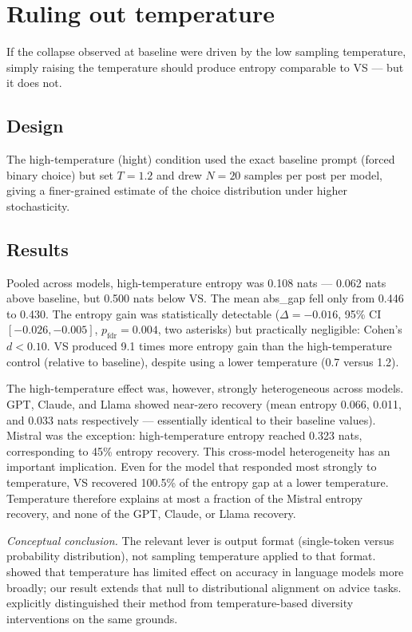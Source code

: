 \section{Ruling out temperature}
\label{sec:d1_temperature}

If the collapse observed at baseline were driven by the low sampling
temperature, simply raising the temperature should produce entropy
comparable to VS — but it does not.

\subsection*{Design}

The high-temperature (hight) condition used the exact baseline prompt
(forced binary choice) but set $T{=}1.2$ and drew $N{=}20$ samples per
post per model, giving a finer-grained estimate of the choice
distribution under higher stochasticity.

\subsection*{Results}

Pooled across models, high-temperature entropy was 0.108 nats —
0.062 nats above baseline, but 0.500 nats below VS. The mean abs\_gap
fell only from 0.446 to 0.430. The entropy gain was statistically
detectable ($\Delta = -0.016$, 95\% CI $[-0.026, -0.005]$,
$p_{\text{fdr}} = 0.004$, two asterisks) but practically negligible:
Cohen's $d < 0.10$. VS produced 9.1 times more entropy gain than
the high-temperature control (relative to baseline), despite using a
lower temperature (0.7 versus 1.2).

The high-temperature effect was, however, strongly heterogeneous across
models. GPT, Claude, and Llama showed near-zero recovery (mean entropy
0.066, 0.011, and 0.033 nats respectively — essentially identical to
their baseline values). Mistral was the exception: high-temperature
entropy reached 0.323 nats, corresponding to 45\% entropy recovery.
This cross-model heterogeneity has an important implication. Even for
the model that responded most strongly to temperature, VS recovered
100.5\% of the entropy gap at a lower temperature. Temperature therefore
explains at most a fraction of the Mistral entropy recovery, and none of
the GPT, Claude, or Llama recovery.

\textit{Conceptual conclusion.} The relevant lever is output format
(single-token versus probability distribution), not sampling temperature
applied to that format. \citet{renze-2024-temperature} showed that
temperature has limited effect on accuracy in language models more
broadly; our result extends that null to distributional alignment on
advice tasks. \citet{zhang-2025-verbalized-sampling} explicitly
distinguished their method from temperature-based diversity interventions
on the same grounds.

